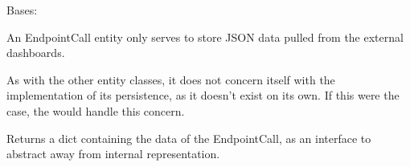 \documentclass[letterpaper,10pt,english]{sphinxmanual}
\begin{document}
\begin{fulllineitems}
\label{\detokenize{pydash_app.dashboard.endpoint_call:pydash_app.dashboard.endpoint_call.EndpointCall}}
Bases: 

An EndpointCall entity only serves to store JSON data pulled from the external dashboards.

As with the other entity classes, it does not concern itself with the implementation of its persistence,
as it doesn’t exist on its own.
If this were the case, the  would handle this concern.

%
\begin{sphinxVerbatim}[commandchars=\\\{\}]
        
\end{sphinxVerbatim}

\begin{fulllineitems}
\label{\detokenize{pydash_app.dashboard.endpoint_call:pydash_app.dashboard.endpoint_call.EndpointCall.as_dict}}
Returns a dict containing the data of the EndpointCall, as an interface to abstract away from internal representation.

\end{fulllineitems}


\end{fulllineitems}
\end{document}
